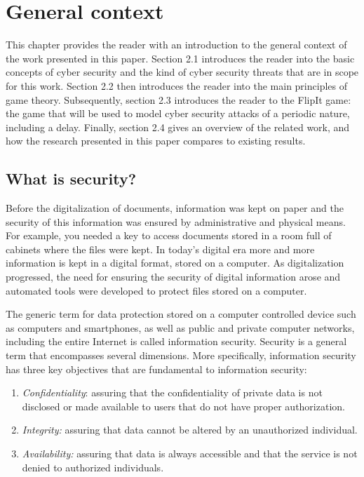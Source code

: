 \chapter{General context}
\label{Chapter1:Intro.Game.Theory}
%


This chapter provides the reader with an introduction to the general context of the work presented in this paper.  Section 2.1 introduces the reader into the basic concepts of cyber security and the kind of cyber security threats that are in scope for this work. Section 2.2 then introduces the reader into the main principles of game theory. Subsequently, section 2.3 introduces the reader to the FlipIt game: the game that will be used to model cyber security attacks of a periodic nature, including a delay.  Finally, section 2.4 gives an overview of the related work, and how the research presented in this paper compares to existing results.

\section{What is security?}

Before the digitalization of documents, information was kept on paper and the security of this information was ensured by administrative and physical means. For example, you needed a key to access documents stored in a room full of cabinets where the files were kept. In today's digital era more and more information is kept in a digital format, stored on a computer.  As digitalization progressed, the need for ensuring the security of digital information arose and automated tools were developed to protect files stored on a computer.  

The generic term for data protection stored on a computer controlled device such as computers and smartphones, as well as public and private computer networks, including the entire Internet is called information security. 
Security is a general term that encompasses several dimensions. More specifically, information security has three key objectives that are fundamental to information security:

\begin{enumerate}
\item  \textit{Confidentiality}: assuring that the confidentiality of private data is not disclosed or made available to users that do not have proper authorization.
\item \textit{Integrity:} assuring that data cannot be altered by an unauthorized individual.
\item \textit{Availability:} assuring that data is always accessible and that the service is not denied to authorized individuals.
\end{enumerate}



